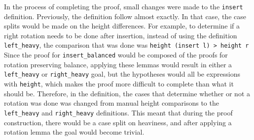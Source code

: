 In the process of completing the proof, small changes were made to the \lstinline{insert} definition. Previously, the definition follow \cite{textbook:discrete_computer} almost exactly. In that case, the case splits would be made on the height differences. For example, to determine if a right rotation needs to be done after insertion, instead of using the definition \lstinline{left_heavy}, the comparison that was done was \lstinline{height (insert l) > height r} Since the proof for \lstinline{insert_balanced} would be composed of the proofs for rotation preserving balance, applying these lemmas would result in either a \lstinline{left_heavy} or \lstinline{right_heavy} goal, but the hypotheses would all be expressions with \lstinline{height}, which makes the proof more difficult to complete than what it should be. Therefore, in the definition, the cases that determine whether or not a rotation was done was changed from manual height comparisons to the \lstinline{left_heavy} and \lstinline{right_heavy} definitions. This meant that during the proof construction, there would be a case split on heaviness, and after applying a rotation lemma the goal would become trivial. 